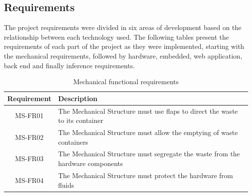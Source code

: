 \documentclass[a4paper,11pt]{article}
\begin{document}
\subsection{Requirements}
\label{subsec:requirement}

The project requirements were divided in six areas of development based on the relationship between each technology used. The following tables present the requirements of each part of the project as they were implemented, starting with the mechanical requirements, followed by hardware, embedded, web application, back end and finally inference requirements.

\begin{table}[H]
  \small
  \caption{\small{Mechanical functional requirements}}
  \begin{center}
    \begin{tabular}{|c|p{95mm}|}
      \hline
      Requirement & Description                                                                    \\ \hline
      MS-FR01     & The Mechanical Structure must use flaps to direct the waste to its container   \\ \hline
      MS-FR02     & The Mechanical Structure must allow the emptying of waste containers           \\ \hline
      MS-FR03     & The Mechanical Structure must segregate the waste from the hardware components \\ \hline
      MS-FR04     & The Mechanical Structure must protect the hardware from fluids                 \\ \hline
    \end{tabular}
  \end{center}
  \label{tab:mechanical0}
\end{table}
\end{document}
